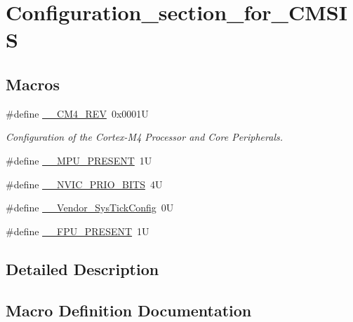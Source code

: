\hypertarget{group___configuration__section__for___c_m_s_i_s}{}\section{Configuration\+\_\+section\+\_\+for\+\_\+\+C\+M\+S\+IS}
\label{group___configuration__section__for___c_m_s_i_s}
\subsection*{Macros}
\begin{DoxyCompactItemize}
\item 
\#define \mbox{\hyperlink{group___configuration__section__for___c_m_s_i_s_ga45a97e4bb8b6ce7c334acc5f45ace3ba}{\+\_\+\+\_\+\+C\+M4\+\_\+\+R\+EV}}~0x0001U
\begin{DoxyCompactList}\small\item\em Configuration of the Cortex-\/\+M4 Processor and Core Peripherals. \end{DoxyCompactList}\item 
\#define \mbox{\hyperlink{group___configuration__section__for___c_m_s_i_s_ga4127d1b31aaf336fab3d7329d117f448}{\+\_\+\+\_\+\+M\+P\+U\+\_\+\+P\+R\+E\+S\+E\+NT}}~1U
\item 
\#define \mbox{\hyperlink{group___configuration__section__for___c_m_s_i_s_gae3fe3587d5100c787e02102ce3944460}{\+\_\+\+\_\+\+N\+V\+I\+C\+\_\+\+P\+R\+I\+O\+\_\+\+B\+I\+TS}}~4U
\item 
\#define \mbox{\hyperlink{group___configuration__section__for___c_m_s_i_s_gab58771b4ec03f9bdddc84770f7c95c68}{\+\_\+\+\_\+\+Vendor\+\_\+\+Sys\+Tick\+Config}}~0U
\item 
\#define \mbox{\hyperlink{group___configuration__section__for___c_m_s_i_s_gac1ba8a48ca926bddc88be9bfd7d42641}{\+\_\+\+\_\+\+F\+P\+U\+\_\+\+P\+R\+E\+S\+E\+NT}}~1U
\end{DoxyCompactItemize}


\subsection{Detailed Description}


\subsection{Macro Definition Documentation}
\mbox{\label{group___configuration__section__for___c_m_s_i_s_ga45a97e4bb8b6ce7c334acc5f45ace3ba}} 
